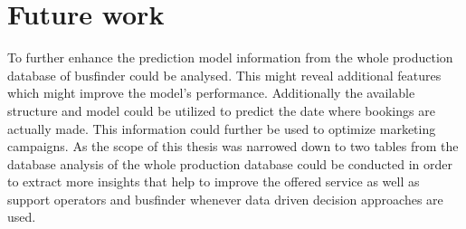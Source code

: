 %
%
% 
% 
% 

\chapter{Future work}
\label{chap:future_work}
To further enhance the prediction model information from the whole production database of busfinder could be analysed. This might reveal additional features which might improve the model's performance. Additionally the available structure and model could be utilized to predict the date where bookings are actually made. This information could further be used to optimize marketing campaigns. As the scope of this thesis was narrowed down to two tables from the database analysis of the whole production database could be conducted in order to extract more insights that help to improve the offered service as well as support operators and busfinder whenever data driven decision approaches are used. 